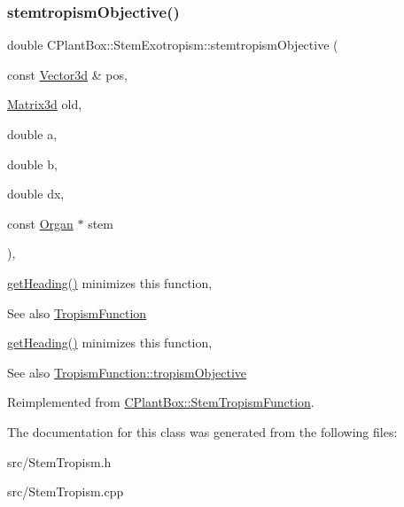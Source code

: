 \subsubsection{\texorpdfstring{stemtropism\+Objective()}{stemtropismObjective()}}
{\footnotesize\ttfamily double C\+Plant\+Box\+::\+Stem\+Exotropism\+::stemtropism\+Objective (\begin{DoxyParamCaption}\item[{const \hyperlink{classCPlantBox_1_1Vector3d}{Vector3d} \&}]{pos,  }\item[{\hyperlink{classCPlantBox_1_1Matrix3d}{Matrix3d}}]{old,  }\item[{double}]{a,  }\item[{double}]{b,  }\item[{double}]{dx,  }\item[{const \hyperlink{classCPlantBox_1_1Organ}{Organ} $\ast$}]{stem }\end{DoxyParamCaption})\hspace{0.3cm}{\ttfamily [override]}, {\ttfamily [virtual]}}



\hyperlink{classCPlantBox_1_1StemTropismFunction_ac72f7ad1200d1defbb3c9b20e20d1f62}{get\+Heading()} minimizes this function, 

\begin{DoxySeeAlso}{See also}
\hyperlink{classCPlantBox_1_1TropismFunction}{Tropism\+Function}
\end{DoxySeeAlso}
\hyperlink{classCPlantBox_1_1StemTropismFunction_ac72f7ad1200d1defbb3c9b20e20d1f62}{get\+Heading()} minimizes this function, \begin{DoxySeeAlso}{See also}
\hyperlink{classCPlantBox_1_1TropismFunction_a4f2c79fff55d1398c98a070dd8ebbe08}{Tropism\+Function\+::tropism\+Objective} 
\end{DoxySeeAlso}


Reimplemented from \hyperlink{classCPlantBox_1_1StemTropismFunction_a86dc37330cbec72042352dcce88756ae}{C\+Plant\+Box\+::\+Stem\+Tropism\+Function}.



The documentation for this class was generated from the following files\+:\begin{DoxyCompactItemize}
\item 
src/Stem\+Tropism.\+h\item 
src/Stem\+Tropism.\+cpp\end{DoxyCompactItemize}
